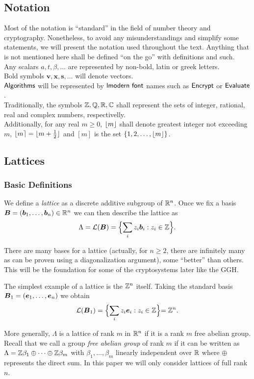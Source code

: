 \subsection{Notation}
Most of the notation is ``standard'' in the field of number theory and cryptography. Nonetheless, to avoid any misunderstandings and simplify some statements, we will present the notation used throughout the text. Anything that is not mentioned here shall be defined ``on the go'' with definitions and such. \\

\noindent Any scalars $a, t, \beta, \dots$ are represented by non-bold, latin or greek letters.\\
Bold symbols $\bm{v}, \bm{x}, \bm{s}, \dots$ will denote vectors. \\
$\alg{Algorithms}$ will be represented by $\alg{lmodern font}$ names such as $\alg{Encrypt}$ or $\alg{Evaluate}$.\\
Traditionally, the symbols $\mathbb{Z}, \mathbb{Q}, \mathbb{R}, \mathbb{C}$ shall represent the sets of integer, rational, real and complex numbers, respectivelly.\\
Additionally, for any real $m \geq 0$, $\lfloor m \rfloor$ shall denote greatest integer not exceeding $m$, $\lfloor m \rceil = \lfloor m + \frac{1}{2} \rfloor$ and $[m]$ is the set $\{1, 2, \dots, \lfloor m \rfloor\}$.

\subsection{Lattices}
\subsubsection*{Basic Definitions}
We define a \textit{lattice} as a discrete additive subgroup of $\mathbb{R}^n$. Once we fix a basis $\boldsymbol{B} = (\boldsymbol{b}_1, \dots ,\boldsymbol{b}_n) \in \mathbb{R}^n$ we can then describe the lattice as
$$ \Lambda = \mathcal{L}(\boldsymbol{B}) = \Bigl\{ \sum_i z_i \boldsymbol{b}_i : z_i \in \mathbb{Z} \Bigl\}.$$

There are many bases for a lattice (actually, for $n \geq 2$, there are infinitely many as can be proven using a diagonalization argument), some ``better'' than others. This will be the foundation for some of the cryptosystems later like the GGH.

\begin{example}
    The simplest example of a lattice is the $\mathbb{Z}^n$ itself. Taking the standard basis $\boldsymbol{B}_1 = (\boldsymbol{e}_1, \dots, \boldsymbol{e}_n)$ we obtain
$$\mathcal{L}(\boldsymbol{B}_1) = \Bigl\{ \sum_i z_i \boldsymbol{e}_i : z_i \in \mathbb{Z} \Bigl\} = \mathbb{Z}^n.$$
\end{example}
More generally, $\Lambda$ is a lattice of rank $m$ in $\mathbb{R}^n$ if it is a rank $m$ free abelian group. Recall that we call a group \textit{free abelian group} of rank $m$ if it can be written as $\Lambda = \mathbb{Z}\beta_1 \oplus \cdots \oplus\mathbb{Z}\beta_m$ with $\beta_1, \dots, \beta_m$ linearly independent over $\mathbb{R}$ where $\oplus$ represents the direct sum. In this paper we will only consider lattices of full rank $n$. 


